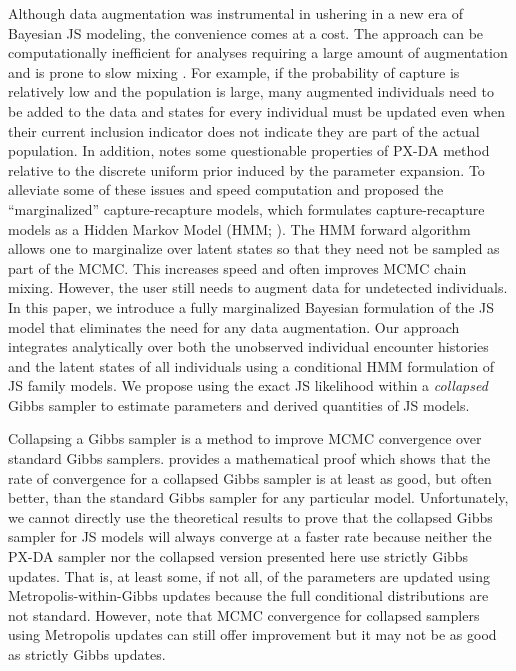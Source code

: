 \documentclass[12pt]{article}
\begin{document}
Although data augmentation was instrumental in ushering in a new era of Bayesian JS modeling, the convenience comes at a cost. The approach can be computationally inefficient for analyses requiring a large amount of augmentation \citep{Royle:2007kx} and is prone to slow mixing \citep{SchofieldBarker2008a}. For example, if the probability of capture is relatively low and the population is large, many augmented individuals need to be added to the data and states for every individual must be updated even when their current inclusion indicator does not indicate they are part of the actual population. In addition, \cite{link2013cautionary} notes some questionable properties of PX-DA method relative to the discrete uniform prior induced by the parameter expansion. To alleviate some of these issues and speed computation \cite{yackulic2020need} and \cite{saracco2023fast} proposed the ``marginalized'' capture-recapture models, which formulates capture-recapture models as a Hidden Markov Model (HMM; \citealt{zucchini2016hidden}). The HMM forward algorithm allows one to marginalize over latent states so that they need not be sampled as part of the MCMC. This increases speed and often improves MCMC chain mixing. However, the user still needs to augment data for undetected individuals. In this paper, we introduce a fully marginalized Bayesian formulation of the JS model that eliminates the need for any data augmentation. Our approach integrates analytically over both the unobserved individual encounter histories and the latent states of all individuals using a conditional HMM formulation of JS family models. We propose using the exact JS likelihood within a {\it collapsed} Gibbs sampler \citep{Liu1994a} to estimate parameters and derived quantities of JS models. 

Collapsing a Gibbs sampler is a method to improve MCMC convergence over standard Gibbs samplers. \cite{Liu1994a} provides a mathematical proof which shows that the rate of convergence for a collapsed Gibbs sampler is at least as good, but often better, than the standard Gibbs sampler for any particular model. Unfortunately, we cannot directly use the theoretical results to prove that the collapsed Gibbs sampler for JS models will always converge at a faster rate because neither the PX-DA sampler nor the collapsed version presented here use strictly Gibbs updates. That is, at least some, if not all, of the parameters are updated using Metropolis-within-Gibbs updates because the full conditional distributions are not standard. However, \cite{VanDykJiao2015a} note that MCMC convergence for collapsed samplers using Metropolis updates can still offer improvement but it may not be as good as strictly Gibbs updates.  
\end{document}
